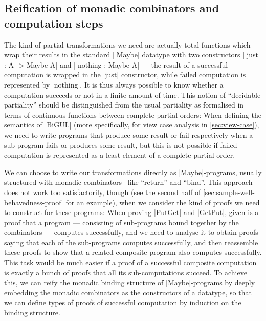 \documentclass{sigplanconf}
\begin{document}
\subsection{Reification of monadic combinators and computation steps}
\label{sec:reification}

The kind of partial transformations we need are actually total functions which wrap their results in the standard |^^^Maybe| datatype with two constructors |^^^just : A -> Maybe A| and |^^^nothing  : Maybe A| --- the result of a successful computation is wrapped in the |just| constructor, while failed computation is represented by |nothing|.
It is thus always possible to know whether a computation succeeds or not in a finite amount of time.
This notion of ``decidable partiality'' should be distinguished from the usual partiality as formalised in terms of continuous functions between complete partial orders:
When defining the semantics of |BiGUL| (more specifically, for view case analysis in \autoref{sec:view-case}), we need to write programs that produce some result or fail respectively when a sub-program fails or produces some result, but this is not possible if failed computation is represented as a least element of a complete partial order.

We can choose to write our transformations directly as |Maybe|-programs, usually structured with monadic combinators~\cite{Moggi-monads,Wadler-essence} like ``return'' and ``bind''.
This approach does not work too satisfactorily, though (see the second half of \autoref{sec:sample-well-behavedness-proof} for an example), when we consider the kind of proofs we need to construct for these programs:
When proving |PutGet| and |GetPut|, given is a proof that a program --- consisting of sub-programs bound together by the combinators --- computes successfully, and we need to analyse it to obtain proofs saying that each of the sub-programs computes successfully, and then reassemble these proofs to show that a related composite program also computes successfully.
This task would be much easier if a proof of a successful composite computation is exactly a bunch of proofs that all its sub-computations succeed.
To achieve this, we can reify the monadic binding structure of |Maybe|-programs by deeply embedding the monadic combinators as the constructors of a datatype, so that we can define types of proofs of successful computation by induction on the binding structure.
\end{document}
